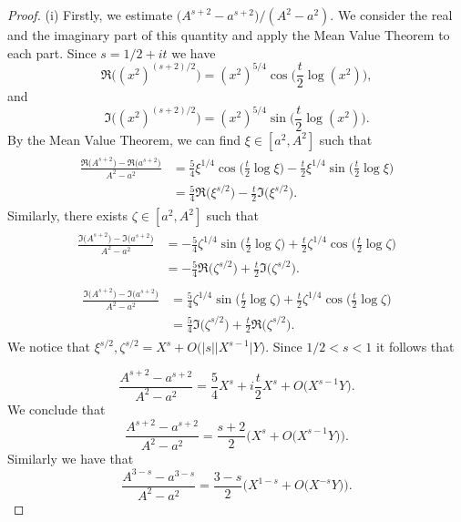 \documentclass[a4paper,11pt]{amsart}
\theoremstyle{definition}
\begin{document}
\begin{proof}






(i) Firstly, we estimate $\big(A^{s+2}-a^{s+2}\big)/(A^2-a^2)$. We consider the real and the imaginary part of this quantity and apply the Mean Value Theorem to each part. 
Since $s=1/2+it$ we have $$\Re\Big((x^2)^{(s+2)/2}\Big)=(x^2)^{5/4}\cos\Big(\frac{t}{2}\log(x^2)\Big),$$ and
$$\Im\Big((x^2)^{(s+2)/2}\Big)=(x^2)^{5/4}\sin\Big(\frac{t}{2}\log(x^2)\Big).$$
By the Mean Value Theorem, we can find  $\xi\in[a^2,A^2]$ such that
\begin{align}
    \begin{split}
        \frac{\Re\big(A^{s+2}\big)-\Re\big(a^{s+2}\big)}{A^2-a^2}&=\frac{5}{4}\xi^{1/4}\cos\Big(\frac{t}{2}\log \xi\Big)-\frac{t}{2}\xi^{1/4}\sin\Big(\frac{t}{2}\log \xi\Big)\\
       &=\frac{5}{4}\Re\big(\xi^{s/2}\big)-\frac{t}{2}\Im\big(\xi^{s/2}\big).
    \end{split}
\end{align}
Similarly, there exists $\zeta \in [a^2,A^2]$ such that
\begin{align}
    \begin{split}
       \frac{\Im\big(A^{s+2}\big)-\Im\big(a^{s+2}\big)}{A^2-a^2}&=-\frac{5}{4}\zeta^{1/4}\sin\Big(\frac{t}{2}\log \zeta\Big)+\frac{t}{2}\zeta^{1/4}\cos\Big(\frac{t}{2}\log \zeta\Big) \\
        &=-\frac{5}{4}\Re\big(\zeta^{s/2}\big)+\frac{t}{2}\Im\big(\zeta^{s/2}\big).
    \end{split}
\end{align}
\begin{align}
    \begin{split}
       \frac{\Im\big(A^{s+2}\big)-\Im\big(a^{s+2}\big)}{A^2-a^2}&=\frac{5}{4}\zeta^{1/4}\sin\Big(\frac{t}{2}\log \zeta\Big)+\frac{t}{2}\zeta^{1/4}\cos\Big(\frac{t}{2}\log \zeta\Big) \\
       &=\frac{5}{4}\Im\big(\zeta^{s/2}\big)+\frac{t}{2}\Re\big(\zeta^{s/2}\big).
   \end{split}
\end{align}
We notice that $\xi^{s/2},\zeta^{s/2} = X^s+O\big(|s|\big|X^{s-1}\big|Y\big)$. Since $1/2<s<1$ it follows that 





$$\frac{A^{s+2}-a^{s+2}}{A^2-a^2}= \frac{5}{4}X^s+i\frac{t}{2}X^s+O\big(X^{s-1}Y\big).$$
We conclude that
\begin{equation}\label{s/2}
   \frac{A^{s+2}-a^{s+2}}{A^2-a^2}=\frac{s+2}{2}\Big(X^s+O\big(X^{s-1}Y\big)\Big).
\end{equation}
Similarly we have that 
\begin{equation}\label{1-s}
   \frac{A^{3-s}-a^{3-s}}{A^2-a^2}=\frac{3-s}{2}\Big(X^{1-s}+O\big(X^{-s}Y\big)\Big).
\end{equation}





\end{proof}
\end{document}
